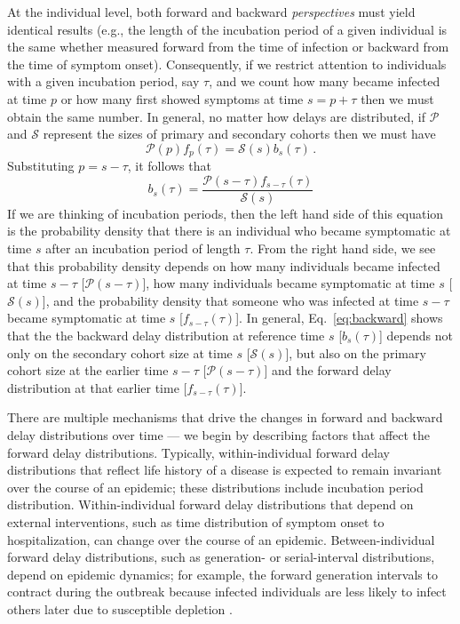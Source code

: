 \documentclass[12pt]{article}
\newcommand{\pt}{p} %
\newcommand{\st}{s} %
\newcommand{\psize}{{\mathcal P}} %
\newcommand{\ssize}{{\mathcal S}} %
\begin{document}
At the individual level, both forward and backward \emph{perspectives}
must yield identical results (e.g., the length of the incubation
period of a given individual is the same whether measured forward from
the time of infection or backward from the time of symptom onset).
Consequently, if we restrict attention to individuals with a given
incubation period, say $\tau$, and we count how many became infected at time $\pt$
or how many first showed symptoms at time $\st=\pt+\tau$ then we must obtain
the same number. In general, no matter how delays are distributed, if
$\mathcal P$ and $\mathcal S$ represent the sizes of primary and
secondary cohorts then we must have
\begin{equation}
\psize(\pt) f_\pt(\tau) = \ssize(\st) b_\st(\tau) \,.
\label{eq:match}
\end{equation}
Substituting $\pt=\st-\tau$, it follows that
\begin{equation}
b_\st(\tau)= \frac{\psize(\st-\tau) f_{\st-\tau} (\tau)}{\ssize(\st)}
\label{eq:backward}
\end{equation}
If we are thinking of incubation periods, then the left hand side of
this equation is the probability density that there is an individual
who became symptomatic at time $\st$ after an incubation period of
length $\tau$. From the right hand side, we see that this probability
density depends on how many individuals became infected at time
$\st-\tau$ [$\psize(\st-\tau)$], how many individuals became
symptomatic at time $\st$ [$\ssize(\st)$], and the probability density
that someone who was infected at time $\st-\tau$ became symptomatic at
time $\st$ [$f_{\st-\tau}(\tau)$]. In general, Eq.~\eqref{eq:backward}
shows that the the backward delay distribution at reference time $\st$
[$b_\st(\tau)$] depends not only on the secondary cohort size at time
$\st$ [$\ssize(\st)$], but also on the primary cohort size at the
earlier time $\st-\tau$ [$\psize(\st-\tau)$] and the forward delay
distribution at that earlier time [$f_{\st-\tau}(\tau)$].

There are multiple mechanisms that drive the changes in forward and backward delay distributions over time ---
we begin by describing factors that affect the forward delay distributions.
Typically, within-individual forward delay distributions that reflect life history of a disease is expected to remain invariant over the course of an epidemic; 
these distributions include incubation period distribution.
Within-individual forward delay distributions that depend on external interventions, such as time distribution of symptom onset to hospitalization, can change over the course of an epidemic.
Between-individual forward delay distributions, such as generation- or serial-interval distributions, depend on epidemic dynamics;
for example, the forward generation intervals to contract during the outbreak because infected individuals are less likely to infect others later due to susceptible depletion \citep{champredon2015intrinsic}.
\end{document}
